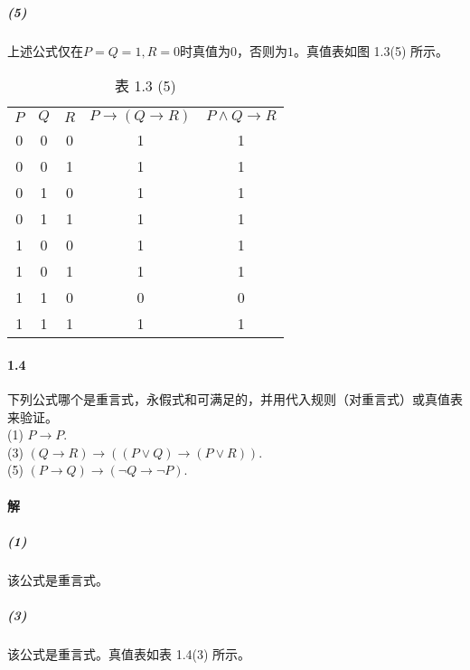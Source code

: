\documentclass[hyperref, UTF8]{ctexart}
\begin{document}
\subparagraph{(5)}上述公式仅在$P=Q=1, R=0$时真值为$0$，否则为$1$。真值表如图 1.3(5) 所示。
\begin{table}[!htb]
\centering
\begin{tabular}{ccccc}
$P$ & $Q$ & $R$ & $P \to (Q \to R)$ & $P \land Q \to R$ \\
0 & 0 & 0 & 1                 & 1                 \\
0 & 0 & 1 & 1                 & 1                 \\
0 & 1 & 0 & 1                 & 1                 \\
0 & 1 & 1 & 1                 & 1                 \\
1 & 0 & 0 & 1                 & 1                 \\
1 & 0 & 1 & 1                 & 1                 \\
1 & 1 & 0 & 0                 & 0                 \\
1 & 1 & 1 & 1                 & 1
\end{tabular}
\caption*{表 1.3 (5)}
\end{table} 

\paragraph{1.4}\label{1.4}
下列公式哪个是重言式，永假式和可满足的，并用代入规则（对重言式）或真值表来验证。\\

\quad (1) $P \to P$. \\

\quad (3) $(Q\to R)\to((P\lor Q)\to (P \lor R)).$  \\

\quad (5) $(P \to Q) \to (\lnot Q \to \lnot P).$ \\

\paragraph{解}

\subparagraph{(1)} 该公式是重言式。

\subparagraph{(3)} 该公式是重言式。真值表如表 1.4(3) 所示。
\end{document}
